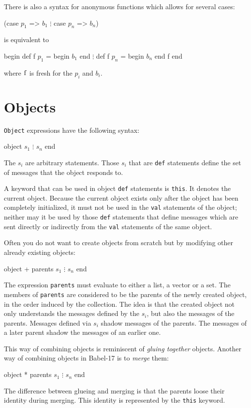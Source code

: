 \documentclass[11pt]{amsart}
\newcommand{\babelsrc}[1] {\lstinline!#1!}
\begin{document}
There is also a syntax for anonymous functions which allows for several cases:
\begin{babellisting}
(case $p_1$ => $b_1$
    $\vdots$
 case $p_n$ => $b_n$)
\end{babellisting}
is equivalent to 
\begin{babellisting}
begin
  def f $p_1$ = begin $b_1$ end
    $\vdots$
  def f $p_n$ = begin $b_n$ end
  f
end
\end{babellisting}
where $\babelsrc{f}$ is fresh for the $p_i$ and $b_i$.

\section{Objects}
\babelsrc{Object} expressions have the following syntax:
\begin{babellisting}
object 
  $s_1$
  $\vdots$
  $s_n$
end
\end{babellisting}
The $s_i$ are arbitrary statements.  Those $s_i$ that are  \babelsrc{def} statements define the set of messages that the object responds to.

A keyword that can be used in object \babelsrc{def} statements is \babelsrc{this}. It denotes the current object. Because the current object exists only after the object has been completely initialized, it must not be used in the \babelsrc{val} statements of the object; neither may it be used by those \babelsrc{def} statements that define messages which are sent directly or indirectly from the \babelsrc{val} statements of the same object.

Often you do not want to create objects from scratch but by modifying other already existing objects:
\begin{babellisting}
object + parents
  $s_1$
  $\vdots$
  $s_n$
end
\end{babellisting}
The expression \babelsrc{parents} must evaluate to either a list, a vector or a set. The members of  \babelsrc{parents}
are considered to be the parents of the newly created object, in the order induced by the collection. The idea is that the created object not only understands the messages defined by the $s_i$, but also the messages of the parents. Messages defined via $s_i$ shadow messages of the parents. The messages of a later parent shadow the messages of an earlier one.

This way of combining objects is reminiscent of \emph{gluing together} objects. Another way of combining objects in Babel-17 is to \emph{merge} them:
\begin{babellisting}
object * parents
  $s_1$
  $\vdots$
  $s_n$
end
\end{babellisting}
The difference between glueing and merging is that the parents loose their identity during merging. This identity is represented by the \babelsrc{this} keyword.
\end{document}
